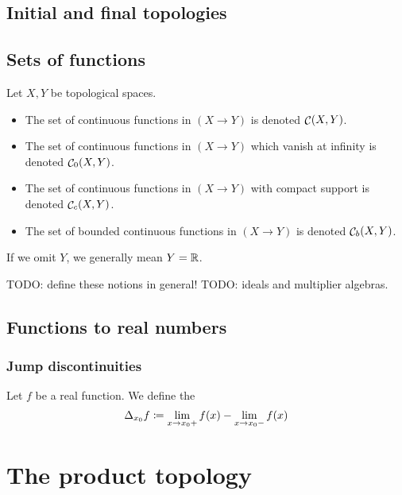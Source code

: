\subsection{Initial and final topologies}

\subsection{Sets of functions}
\begin{definition}
Let $X, Y$ be topological spaces.
\begin{itemize}
\item The set of continuous functions in $(X\to Y)$ is denoted $\mathop{\mathcal{C}}(X, Y)$.
\item The set of continuous functions in $(X\to Y)$ which vanish at infinity is denoted $\mathop{\mathcal{C}}_0(X, Y)$.
\item The set of continuous functions in $(X\to Y)$ with compact support is denoted $\mathop{\mathcal{C}}_c(X, Y)$.
\item The set of bounded continuous functions in $(X\to Y)$ is denoted $\mathop{\mathcal{C}}_b(X, Y)$.
\end{itemize}
If we omit $Y$, we generally mean $Y = \mathbb{R}$.
\end{definition}

TODO: define these notions in general!
TODO: ideals and multiplier algebras.

\subsection{Functions to real numbers}
\subsubsection{Jump discontinuities}
\begin{definition}
Let $f$ be a real function. We define the 
\[ \Delta_{x_0}f \coloneqq \lim_{x\to x_0+} f(x) - \lim_{x\to x_0-} f(x) \]
\end{definition}


\section{The product topology}
